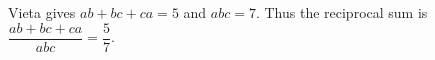 Vieta gives $ab+bc+ca=5$ and $abc=7$. Thus the reciprocal sum is $\dfrac{ab+bc+ca}{abc}=\boxed{\dfrac{5}{7}}$.
